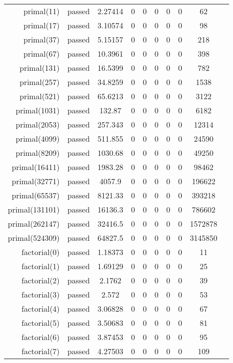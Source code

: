 \begin{longtable}{r|ccccccccc}
    primal(11) & passed & 2.27414 & 0 & 0 & 0 & 0 & 0 & 62 \\
    primal(17) & passed & 3.10574 & 0 & 0 & 0 & 0 & 0 & 98 \\
    primal(37) & passed & 5.15157 & 0 & 0 & 0 & 0 & 0 & 218 \\
    primal(67) & passed & 10.3961 & 0 & 0 & 0 & 0 & 0 & 398 \\
    primal(131) & passed & 16.5399 & 0 & 0 & 0 & 0 & 0 & 782 \\
    primal(257) & passed & 34.8259 & 0 & 0 & 0 & 0 & 0 & 1538 \\
    primal(521) & passed & 65.6213 & 0 & 0 & 0 & 0 & 0 & 3122 \\
    primal(1031) & passed & 132.87 & 0 & 0 & 0 & 0 & 0 & 6182 \\
    primal(2053) & passed & 257.343 & 0 & 0 & 0 & 0 & 0 & 12314 \\
    primal(4099) & passed & 511.855 & 0 & 0 & 0 & 0 & 0 & 24590 \\
    primal(8209) & passed & 1030.68 & 0 & 0 & 0 & 0 & 0 & 49250 \\
    primal(16411) & passed & 1983.28 & 0 & 0 & 0 & 0 & 0 & 98462 \\
    primal(32771) & passed & 4057.9 & 0 & 0 & 0 & 0 & 0 & 196622 \\
    primal(65537) & passed & 8121.33 & 0 & 0 & 0 & 0 & 0 & 393218 \\
    primal(131101) & passed & 16136.3 & 0 & 0 & 0 & 0 & 0 & 786602 \\
    primal(262147) & passed & 32416.5 & 0 & 0 & 0 & 0 & 0 & 1572878 \\
    primal(524309) & passed & 64827.5 & 0 & 0 & 0 & 0 & 0 & 3145850 \\
    factorial(0) & passed & 1.18373 & 0 & 0 & 0 & 0 & 0 & 11 \\
    factorial(1) & passed & 1.69129 & 0 & 0 & 0 & 0 & 0 & 25 \\
    factorial(2) & passed & 2.1762 & 0 & 0 & 0 & 0 & 0 & 39 \\
    factorial(3) & passed & 2.572 & 0 & 0 & 0 & 0 & 0 & 53 \\
    factorial(4) & passed & 3.06828 & 0 & 0 & 0 & 0 & 0 & 67 \\
    factorial(5) & passed & 3.50683 & 0 & 0 & 0 & 0 & 0 & 81 \\
    factorial(6) & passed & 3.87453 & 0 & 0 & 0 & 0 & 0 & 95 \\
    factorial(7) & passed & 4.27503 & 0 & 0 & 0 & 0 & 0 & 109 \\

\end{longtable}
